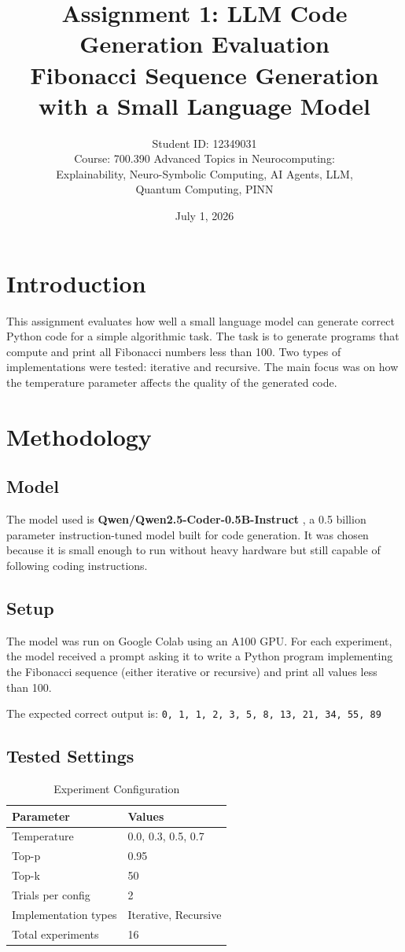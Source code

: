 \documentclass[11pt,a4paper]{article}
\title{Assignment 1: LLM Code Generation Evaluation\\
\large Fibonacci Sequence Generation with a Small Language Model}
\author{
    Student ID: 12349031 \\
    \small Course: 700.390 Advanced Topics in Neurocomputing:\\
    \small Explainability, Neuro-Symbolic Computing, AI Agents, LLM,\\
    \small Quantum Computing, PINN
}
\date{July 1, 2026}
\begin{document}
\maketitle

\section{Introduction}

This assignment evaluates how well a small language model can generate correct Python code for a simple algorithmic task. The task is to generate programs that compute and print all Fibonacci numbers less than 100. Two types of implementations were tested: iterative and recursive. The main focus was on how the temperature parameter affects the quality of the generated code.

\section{Methodology}

\subsection{Model}

The model used is \textbf{Qwen/Qwen2.5-Coder-0.5B-Instruct} \cite{qwen2025coder}, a 0.5 billion parameter instruction-tuned model built for code generation. It was chosen because it is small enough to run without heavy hardware but still capable of following coding instructions.

\subsection{Setup}

The model was run on Google Colab using an A100 GPU. For each experiment, the model received a prompt asking it to write a Python program implementing the Fibonacci sequence (either iterative or recursive) and print all values less than 100.

The expected correct output is: \texttt{0, 1, 1, 2, 3, 5, 8, 13, 21, 34, 55, 89}

\subsection{Tested Settings}

\begin{table}[H]
\centering
\caption{Experiment Configuration}
\begin{tabular}{ll}
\toprule
\textbf{Parameter} & \textbf{Values} \\
\midrule
Temperature & 0.0, 0.3, 0.5, 0.7 \\
Top-p & 0.95 \\
Top-k & 50 \\
Trials per config & 2 \\
Implementation types & Iterative, Recursive \\
Total experiments & 16 \\
\bottomrule
\end{tabular}
\end{table}
\end{document}
